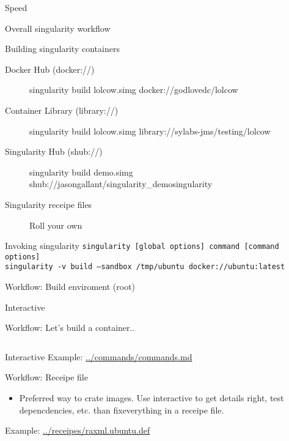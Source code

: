 \documentclass{beamer}
\begin{document}
  \begin{frame}{Speed}

  \end{frame}

  \begin{frame}{Overall singularity workflow}
    
  \end{frame}

  \begin{frame}{Building singularity containers}
    \begin{description}
      \item[Docker Hub (docker://)] singularity build lolcow.simg docker://godlovedc/lolcow
      \item[Container Library (library://)] singularity build lolcow.simg library://sylabs-jms/testing/lolcow
      \item[Singularity Hub (shub://)] singularity build demo.simg shub://jasongallant/singularity\_demosingularity
      \item[Singularity receipe files] Roll your own
    \end{description}
  \end{frame}

  \begin{frame}{Invoking singularity}
    \footnotesize
    \texttt{singularity [global options] command [command options]}\\
    \texttt{singularity -v build --sandbox /tmp/ubuntu docker://ubuntu:latest}
  \end{frame}

  \begin{frame}{Workflow: Build enviroment (root)}
    \small
    \begin{block}{Interactive}
    \end{block}
  \end{frame}

  \begin{frame}{Workflow: Let's build a container..}
    \begin{verbatim}
      \end{verbatim}
    \begin{block}{Interactive}
      Example: \url{../commands/commands.md}
    \end{block}
  \end{frame}

  \begin{frame}{Workflow: Receipe file}
      \begin{itemize}
        \item Preferred way to crate images. Use interactive to get details
              right, test depencdencies, etc.  than fixeverything in a receipe
              file.
        \end{itemize}
      Example: \url{../receipes/raxml.ubuntu.def}
  \end{frame}
\end{document}
